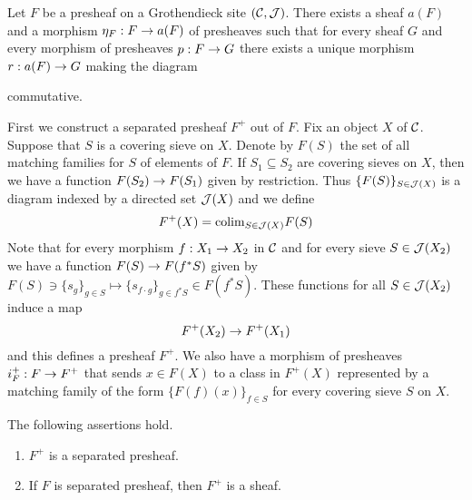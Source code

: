 \begin{theorem}\label{theorem:associatedsheaf}
Let $F$ be a presheaf on a Grothendieck site $({\mathcal C},{\mathcal J})$. There exists a sheaf $a(F)$ and a morphism $\eta_F:F \rightarrow a(F)$ of presheaves such that for every sheaf $G$ and every morphism of presheaves $p:F \rightarrow G$ there exists a unique morphism $r:a(F)\rightarrow G$ making the diagram
\begin{center}
\end{center}
commutative.
\end{theorem}
\noindent
First we construct a separated presheaf $F^+$ out of $F$. Fix an object $X$ of ${\mathcal C}$. Suppose that $S$ is a covering sieve on $X$. Denote by $F(S)$ the set of all matching families for $S$ of elements of $F$. If $S_1\subseteq S_2$ are covering sieves on $X$, then we have a function $F(S_2)\rightarrow F(S_1)$ given by restriction. Thus $\{F(S)\}_{S\in {\mathcal J}(X)}$ is a diagram indexed by a directed set ${\mathcal J}(X)$ and we define
$$F^+(X)=\mathrm{colim}_{S\in {\mathcal J}(X)}F(S)$$
Note that for every morphism $f:X_1\rightarrow X_2$ in ${\mathcal C}$ and for every sieve $S\in {\mathcal J}(X_2)$ we have a function $F(S)\rightarrow F(f^*S)$ given by $F(S)\ni \{s_g\}_{g\in S}\mapsto \{s_{f\cdot g}\}_{g\in f^*S}\in F(f^*S)$. These functions for all $S\in {\mathcal J}(X_2)$ induce a map
$$F^+(X_2)\rightarrow F^+(X_1)$$
and this defines a presheaf $F^+$. We also have a morphism of presheaves $i_F^+:F\rightarrow F^+$ that sends $x\in F(X)$ to a class in $F^+(X)$ represented by a matching family of the form $\{F(f)(x)\}_{f\in S}$ for every covering sieve $S$ on $X$.
\begin{lemma}\label{lemma:plusconstruction}
The following assertions hold.
\begin{enumerate}[label=\emph{\textbf{(\arabic*)}}, leftmargin=1.5em]
\item $F^+$ is a separated presheaf.
\item If $F$ is separated presheaf, then $F^+$ is a sheaf.
\end{enumerate} 
\end{lemma}
